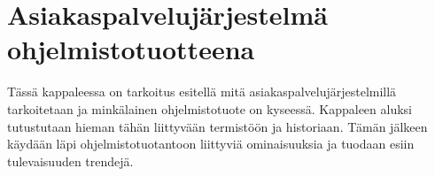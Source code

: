 \documentclass[finnish,12pt,a4paper,pdftex]{article}
\begin{document}

\section{Asiakaspalvelujärjestelmä ohjelmistotuotteena}
Tässä kappaleessa on tarkoitus esitellä mitä asiakaspalvelujärjestelmillä tarkoitetaan ja minkälainen ohjelmistotuote on kyseessä. Kappaleen aluksi tutustutaan hieman tähän liittyvään termistöön ja historiaan. Tämän jälkeen käydään läpi ohjelmistotuotantoon liittyviä ominaisuuksia ja tuodaan esiin tulevaisuuden trendejä.
\end{document}

